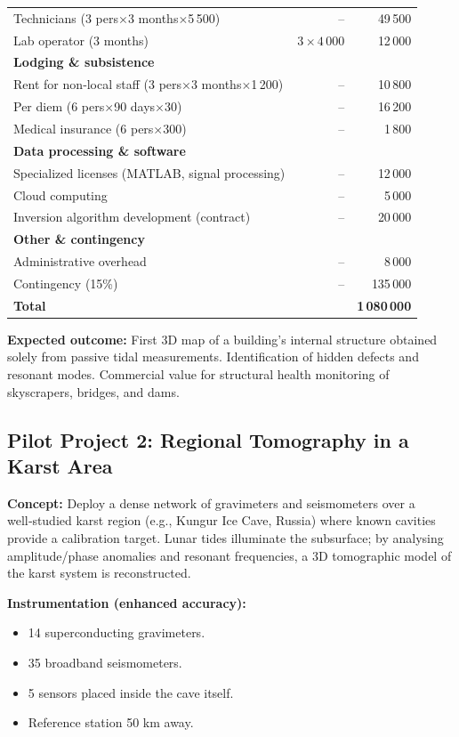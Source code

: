 \documentclass[12pt,a4paper]{article}
\theoremstyle{remark}
\begin{document}
\begin{table}[htbp]
\begin{tabular}{lrr}
			Technicians (3 pers$\times$3 months$\times$5\,500) & – & 49\,500 \\
			Lab operator (3 months) & $3\times4\,000$ & 12\,000 \\
			\multicolumn{3}{l}{\textbf{Lodging \& subsistence}} \\
			Rent for non‑local staff (3 pers$\times$3 months$\times$1\,200) & – & 10\,800 \\
			Per diem (6 pers$\times$90 days$\times$30) & – & 16\,200 \\
			Medical insurance (6 pers$\times$300) & – & 1\,800 \\
			\multicolumn{3}{l}{\textbf{Data processing \& software}} \\
			Specialized licenses (MATLAB, signal processing) & – & 12\,000 \\
			Cloud computing & – & 5\,000 \\
			Inversion algorithm development (contract) & – & 20\,000 \\
			\multicolumn{3}{l}{\textbf{Other \& contingency}} \\
			Administrative overhead & – & 8\,000 \\
			Contingency (15\%) & – & 135\,000 \\
			\midrule
			\textbf{Total} & & \textbf{1\,080\,000} \\
			\bottomrule
		\end{tabular}
	\end{table}
	
	\textbf{Expected outcome:} First 3D map of a building's internal structure obtained solely from passive tidal measurements. Identification of hidden defects and resonant modes. Commercial value for structural health monitoring of skyscrapers, bridges, and dams.
	
	\subsection{Pilot Project 2: Regional Tomography in a Karst Area}
	
	\textbf{Concept:} Deploy a dense network of gravimeters and seismometers over a well‑studied karst region (e.g., Kungur Ice Cave, Russia) where known cavities provide a calibration target. Lunar tides illuminate the subsurface; by analysing amplitude/phase anomalies and resonant frequencies, a 3D tomographic model of the karst system is reconstructed.
	
	\textbf{Instrumentation (enhanced accuracy):}
	\begin{itemize}
		\item 14 superconducting gravimeters.
		\item 35 broadband seismometers.
		\item 5 sensors placed inside the cave itself.
		\item Reference station 50 km away.
	\end{itemize}
	
\end{document}
